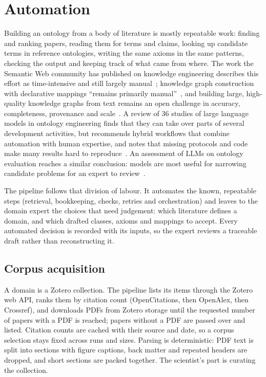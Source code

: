 
\section{Automation}\label{sec:automation}

Building an ontology from a body of literature is mostly repeatable work: finding and ranking papers, reading them for terms and claims, looking up candidate terms in reference ontologies, writing the same axioms in the same patterns, checking the output and keeping track of what came from where. The work the Semantic Web community has published on knowledge engineering describes this effort as time-intensive and still largely manual~\citep{tsaneva2025llmeval}; knowledge graph construction with declarative mappings ``remains primarily manual''~\citep{chavesfraga2026kgc}, and building large, high-quality knowledge graphs from text remains an open challenge in accuracy, completeness, provenance and scale~\citep{kggentext2026editorial}. A review of 36 studies of large language models in ontology engineering finds that they can take over parts of several development activities, but recommends hybrid workflows that combine automation with human expertise, and notes that missing protocols and code make many results hard to reproduce~\citep{li2025llmoe}. An assessment of LLMs on ontology evaluation reaches a similar conclusion: models are most useful for narrowing candidate problems for an expert to review~\citep{tsaneva2025llmeval}.

The pipeline follows that division of labour. It automates the known, repeatable steps (retrieval, bookkeeping, checks, retries and orchestration) and leaves to the domain expert the choices that need judgement: which literature defines a domain, and which drafted classes, axioms and mappings to accept. Every automated decision is recorded with its inputs, so the expert reviews a traceable draft rather than reconstructing it.

\subsection{Corpus acquisition}

A domain is a Zotero collection. The pipeline lists its items through the Zotero web API, ranks them by citation count (OpenCitations, then OpenAlex, then Crossref), and downloads PDFs from Zotero storage until the requested number of papers with a PDF is reached; papers without a PDF are passed over and listed. Citation counts are cached with their source and date, so a corpus selection stays fixed across runs and sizes. Parsing is deterministic: PDF text is split into sections with figure captions, back matter and repeated headers are dropped, and short sections are packed together. The scientist's part is curating the collection.

